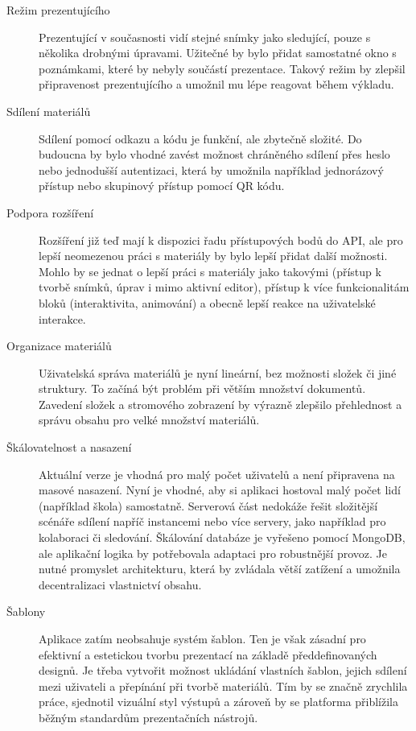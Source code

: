 \begin{description}
  \item[Režim prezentujícího] Prezentující v současnosti vidí stejné snímky jako sledující, pouze s několika drobnými úpravami. 
  Užitečné by bylo přidat samostatné okno s poznámkami, které by nebyly součástí prezentace. 
  Takový režim by zlepšil připravenost prezentujícího a umožnil mu lépe reagovat během výkladu.

  \item[Sdílení materiálů] Sdílení pomocí odkazu a kódu je funkční, ale zbytečně složité. 
  Do budoucna by bylo vhodné zavést možnost chráněného sdílení přes heslo nebo jednodušší autentizaci, která by umožnila například jednorázový přístup nebo skupinový přístup pomocí QR kódu.

  \item[Podpora rozšíření] Rozšíření již teď mají k dispozici řadu přístupových bodů do API, ale pro lepší neomezenou práci s materiály by bylo lepší přidat další možnosti.
  Mohlo by se jednat o lepší práci s materiály jako takovými (přístup k tvorbě snímků, úprav i mimo aktivní editor), přístup k více funkcionalitám bloků (interaktivita, animování) a obecně lepší reakce na uživatelské interakce.

  \item[Organizace materiálů] Uživatelská správa materiálů je nyní lineární, bez možnosti složek či jiné struktury. 
  To začíná být problém při větším množství dokumentů. 
  Zavedení složek a stromového zobrazení by výrazně zlepšilo přehlednost a správu obsahu pro velké množství materiálů.

  \item[Škálovatelnost a nasazení] Aktuální verze je vhodná pro malý počet uživatelů a není připravena na masové nasazení. 
  Nyní je vhodné, aby si aplikaci hostoval malý počet lidí (například škola) samostatně.
  Serverová část nedokáže řešit složitější scénáře sdílení napříč instancemi nebo více servery, jako například pro kolaboraci či sledování.
  Škálování databáze je vyřešeno pomocí MongoDB, ale aplikační logika by potřebovala adaptaci pro robustnější provoz. 
  Je nutné promyslet architekturu, která by zvládala větší zatížení a umožnila decentralizaci vlastnictví obsahu.

  \item[Šablony] Aplikace zatím neobsahuje systém šablon. 
  Ten je však zásadní pro efektivní a estetickou tvorbu prezentací na základě předdefinovaných designů. 
  Je třeba vytvořit možnost ukládání vlastních šablon, jejich sdílení mezi uživateli a přepínání při tvorbě materiálů. 
  Tím by se značně zrychlila práce, sjednotil vizuální styl výstupů a zároveň by se platforma přiblížila běžným standardům prezentačních nástrojů.


\end{description}
